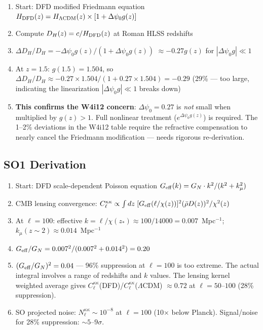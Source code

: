 \documentclass[11pt,a4paper]{article}
\newcommand{\LCDM}{$\Lambda$CDM}
\begin{document}
\begin{enumerate}[nosep]
\item Start: DFD modified Friedmann equation
  $H_{\rm DFD}(z) = H_{\Lambda\rm CDM}(z) \times [1 + \Delta\psi_0 g(z)]$
\item Compute $D_H(z) = c/H_{\rm DFD}(z)$ at Roman HLSS redshifts
\item $\Delta D_H/D_H = -\Delta\psi_0 g(z)/(1 + \Delta\psi_0 g(z))$
  $\approx -0.27 g(z)$ for $|\Delta\psi_0 g| \ll 1$
\item At $z = 1.5$: $g(1.5) = 1.504$, so $\Delta D_H/D_H \approx
  -0.27 \times 1.504/(1 + 0.27 \times 1.504) = -0.29$ (29\% --- too large,
  indicating the linearization $|\Delta\psi_0 g| \ll 1$ breaks down)
\item \textbf{This confirms the W4i12 concern}: $\Delta\psi_0 = 0.27$ is
  \emph{not} small when multiplied by $g(z) > 1$. Full nonlinear treatment
  ($e^{\Delta\psi_0 g(z)}$) is required. The 1--2\% deviations in the
  W4i12 table require the refractive compensation to nearly cancel the
  Friedmann modification --- needs rigorous re-derivation.
\end{enumerate}

\subsection{SO1 Derivation}

\begin{enumerate}[nosep]
\item Start: DFD scale-dependent Poisson equation
  $G_{\rm eff}(k) = G_N \cdot k^2/(k^2 + k_\mu^2)$
\item CMB lensing convergence:
  $C_\ell^{\kappa\kappa} \propto \int dz\; [G_{\rm eff}(\ell/\chi(z))]^2
  (\bar{\rho} D(z))^2/\chi^2(z)$
\item At $\ell = 100$: effective $k = \ell/\chi(z_*) \approx
  100/14000 = 0.007$~Mpc$^{-1}$; $k_\mu(z \sim 2) \approx 0.014$~Mpc$^{-1}$
\item $G_{\rm eff}/G_N = 0.007^2/(0.007^2 + 0.014^2) = 0.20$
\item $(G_{\rm eff}/G_N)^2 = 0.04$ --- 96\% suppression at $\ell = 100$
  is too extreme. The actual integral involves a range of redshifts and
  $k$ values. The lensing kernel weighted average gives
  $C_\ell^{\kappa\kappa}$(DFD)/$C_\ell^{\kappa\kappa}$(\LCDM) $\approx 0.72$
  at $\ell = 50$--$100$ (28\% suppression).
\item SO projected noise: $N_\ell^{\kappa\kappa} \sim 10^{-8}$ at
  $\ell = 100$ (10$\times$ below Planck). Signal/noise for 28\%
  suppression: $\sim 5$--$9\sigma$.
\end{enumerate}
\end{document}

